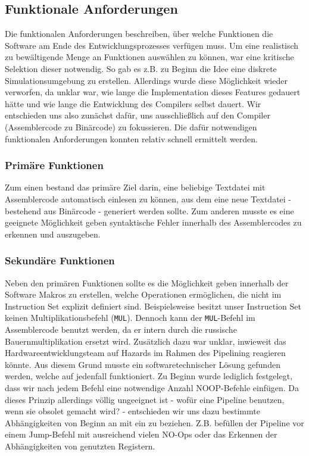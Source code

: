 \documentclass[paper=a4,fontsize=12pt,twocolumn]{scrreprt}
\begin{document}
\subsection{Funktionale Anforderungen}
Die funktionalen Anforderungen beschreiben, über welche Funktionen die Software am Ende des Entwicklungsprozesses verfügen muss.
Um eine realistisch zu bewältigende Menge an Funktionen auswählen zu können, war eine  kritische Selektion dieser notwendig. 
So gab es z.B. zu Beginn die Idee eine diskrete Simulationsumgebung zu erstellen. Allerdings wurde diese Möglichkeit wieder verworfen, da unklar war, wie lange die Implementation dieses Features gedauert hätte und wie lange die Entwicklung des Compilers selbst dauert.
Wir entschieden uns also zunächst dafür, uns ausschließlich auf den Compiler (Assemblercode zu Binärcode) zu fokussieren.
Die dafür notwendigen funktionalen Anforderungen konnten relativ schnell ermittelt werden.

\subsubsection{Primäre Funktionen}
Zum einen bestand das primäre Ziel darin, eine beliebige Textdatei mit Assemblercode automatisch einlesen zu können, aus dem eine neue Textdatei - bestehend aus Binärcode - generiert werden sollte. Zum anderen musste es eine geeignete Möglichkeit geben syntaktische Fehler innerhalb des Assemblercodes zu erkennen und auszugeben.

\subsubsection{Sekundäre Funktionen}
Neben den primären Funktionen sollte es die Möglichkeit geben innerhalb der Software Makros zu erstellen, welche Operationen ermöglichen, die nicht im Instruction Set explizit definiert sind. Beispielsweise besitzt unser Instruction Set keinen Multiplikationsbefehl (\texttt{MUL}).
Dennoch kann der \texttt{MUL}-Befehl im Assemblercode benutzt werden, da er intern durch die russische Bauernmultiplikation ersetzt wird.
Zusätzlich dazu war unklar, inwieweit das Hardwareentwicklungsteam auf Hazards im Rahmen des Pipelining reagieren könnte. Aus diesem Grund musste ein softwaretechnischer Lösung  gefunden werden, welche auf jedenfall funktioniert.
Zu Beginn wurde lediglich festgelegt, dass wir nach jedem Befehl eine notwendige Anzahl NOOP-Befehle einfügen.
Da dieses Prinzip allerdings völlig ungeeignet ist - wofür eine Pipeline benutzen, wenn sie obsolet gemacht wird? - entschieden wir uns dazu bestimmte Abhängigkeiten von Beginn an mit ein zu beziehen.
Z.B. befüllen der Pipeline vor einem Jump-Befehl mit ausreichend vielen NO-Ops oder das Erkennen der Abhängigkeiten von genutzten Registern.
\end{document}
